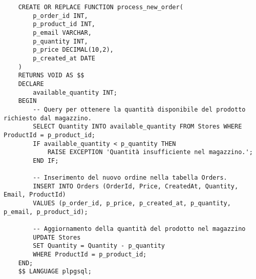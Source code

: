 \begin{lstlisting}
    CREATE OR REPLACE FUNCTION process_new_order(
        p_order_id INT,
        p_product_id INT,
        p_email VARCHAR,
        p_quantity INT,
        p_price DECIMAL(10,2),
        p_created_at DATE
    )
    RETURNS VOID AS $$
    DECLARE
        available_quantity INT;
    BEGIN
        -- Query per ottenere la quantità disponibile del prodotto richiesto dal magazzino.
        SELECT Quantity INTO available_quantity FROM Stores WHERE ProductId = p_product_id;
        IF available_quantity < p_quantity THEN
            RAISE EXCEPTION 'Quantità insufficiente nel magazzino.';
        END IF;

        -- Inserimento del nuovo ordine nella tabella Orders.
        INSERT INTO Orders (OrderId, Price, CreatedAt, Quantity, Email, ProductId)
        VALUES (p_order_id, p_price, p_created_at, p_quantity, p_email, p_product_id);

        -- Aggiornamento della quantità del prodotto nel magazzino
        UPDATE Stores
        SET Quantity = Quantity - p_quantity
        WHERE ProductId = p_product_id;
    END;
    $$ LANGUAGE plpgsql;
\end{lstlisting}